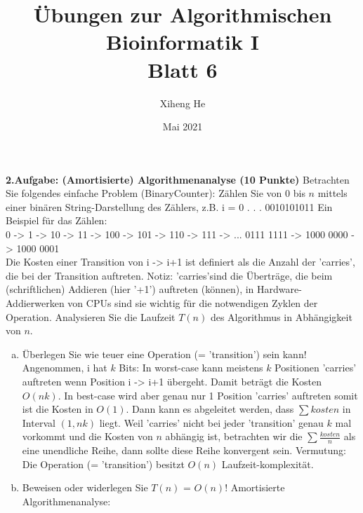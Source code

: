 \documentclass{article}
\title{Übungen zur Algorithmischen Bioinformatik I\\
Blatt 6}
\author{Xiheng He }
\date{Mai 2021}
\begin{document}
\maketitle
\begin{flushleft}
\textbf{2.Aufgabe: (Amortisierte) Algorithmenanalyse (10 Punkte)}
\newline
Betrachten Sie folgendes einfache Problem (BinaryCounter):
\newline
Zählen Sie von 0 bis $n$ mittels einer binären String-Darstellung des Zählers, z.B. i = 0 . . . 0010101011
\newline
Ein Beispiel für das Zählen:
\newline \\
0 -> 1 -> 10 -> 11 -> 100 -> 101 -> 110 -> 111 -> ... 0111 1111 -> 1000 0000 -> 1000 0001
\newline \\
Die Kosten einer Transition von i -> i+1 ist definiert als die Anzahl der ’carries’, die bei der
Transition auftreten.
\newline
Notiz: ’carries’sind die Überträge, die beim (schriftlichen) Addieren (hier ’+1’) auftreten (können),
in Hardware-Addierwerken von CPUs sind sie wichtig für die notwendigen Zyklen der Operation.
\newline
Analysieren Sie die Laufzeit $T(n)$ des Algorithmus in Abhängigkeit von $n$.
\newline
\begin{enumerate}[(a)]
    \item Überlegen Sie wie teuer eine Operation (= ’transition’) sein kann!
    \newline
    Angenommen, i hat $k$ Bits:
    \newline
    In worst-case kann meistens $k$ Positionen ’carries’ auftreten wenn Position i -> i+1 übergeht. Damit beträgt die Kosten $O(nk)$.
    In best-case wird aber genau nur 1 Position ’carries’ auftreten somit ist die Kosten in $O(1)$.
    Dann kann es abgeleitet werden, dass $\sum kosten$ in Interval $(1, nk)$ liegt.
    Weil ’carries’ nicht bei jeder ’transition’ genau $k$ mal vorkommt und die Kosten von $n$ abhängig ist, betrachten wir die $\sum \frac{kosten}{n}$ als eine 
    unendliche Reihe, dann sollte diese Reihe konvergent sein.
    \newline
    Vermutung: Die Operation (= ’transition’) besitzt $O(n)$ Laufzeit-komplexität.
    \item  Beweisen oder widerlegen Sie $T(n)$ = $O(n)$!
    \newline
    Amortisierte Algorithmenanalyse:

\end{enumerate}
\end{flushleft}
\end{document}
